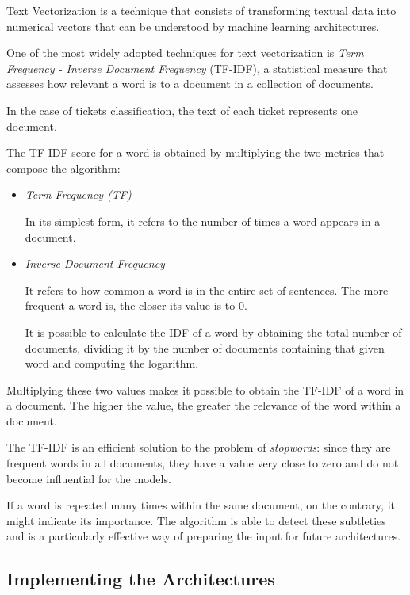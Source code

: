 \documentclass[letterpaper,11pt]{article}
\begin{document}
Text Vectorization is a technique that consists of transforming textual data into numerical vectors that can be understood by machine learning architectures.

One of the most widely adopted techniques for text vectorization is \textit{Term Frequency - Inverse Document Frequency} (TF-IDF), a statistical measure that assesses how relevant a word is to a document in a collection of documents.

In the case of tickets classification, the text of each ticket represents one document.

The TF-IDF score for a word is obtained by multiplying the two metrics that compose the algorithm:

\begin{itemize}
  \item \textit{Term Frequency (TF)}
  
  In its simplest form, it refers to the number of times a word appears in a document.

  \item \textit{Inverse Document Frequency}
  
  It refers to how common a word is in the entire set of sentences. The more frequent a word is, the closer its value is to 0.

  It is possible to calculate the IDF of a word by obtaining the total number of documents, dividing it by the number of documents containing that given word and computing the logarithm.
\end{itemize}

Multiplying these two values makes it possible to obtain the TF-IDF of a word in a document. The higher the value, the greater the relevance of the word within a document.

The TF-IDF is an efficient solution to the problem of \textit{stopwords}: since they are frequent words in all documents, they have a value very close to zero and do not become influential for the models.

If a word is repeated many times within the same document, on the contrary, it might indicate its importance. The algorithm is able to detect these subtleties and is a particularly effective way of preparing the input for future architectures.


\subsection{Implementing the Architectures}
\label{subsec:implementation}
\end{document}
